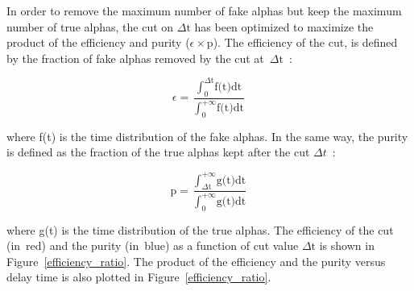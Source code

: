 \documentclass[main.tex]{subfiles}
\begin{document}
\noindent In order to remove the maximum number of fake alphas but keep the maximum number of true alphas, the cut on $\Delta \text{t}$ has been optimized to maximize the product of the efficiency and purity ($\epsilon \times \text{p}$). The efficiency of the cut, is defined by the fraction of fake alphas removed by the cut at~$\Delta \text{t}$~:


\begin{equation}
\epsilon = \frac{ \displaystyle{\int_0^{\Delta \text{t}}} \text{f(t)} \text{dt} } { \displaystyle{\int_\text{0}^{+\infty}} \text{f(t)} \text{dt}} 
\end{equation}


\noindent where f(t) is the time distribution of the fake alphas. In the same way, the purity is defined as the fraction of the true alphas kept after the cut $\Delta t$~:

\begin{equation}
\text{p} = \frac{ \displaystyle{\int_{\Delta \text{t}}^{+\infty}} \text{g(t)} \text{dt} } { \displaystyle{\int_\text{0}^{+\infty}} \text{g(t)} \text{dt}} 
\end{equation}

\noindent where g(t) is the time distribution of the true alphas. The efficiency of the cut (in~red) and the purity (in~blue) as a function of cut value $\Delta \text{t}$ is shown in Figure~\ref{efficiency_ratio}. The product of the efficiency and the purity versus delay time is also plotted in Figure~\ref{efficiency_ratio}.
\end{document}
